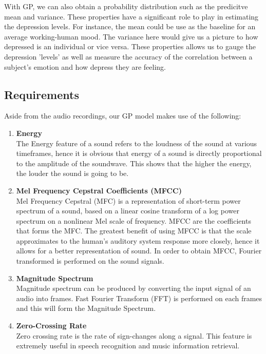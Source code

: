 \documentclass{article}
\begin{document}
	With GP, we can also obtain a probability distribution such as the predicitve mean and variance. 
	These properties have a significant role to play in estimating the depression levels. For instance, the mean could be use as the baseline for an average working-human mood. 
	The variance here would give us a picture to how depressed is an individual or vice versa.
	These properties allows us to gauge the depression 'levels' as well as measure the accuracy of the correlation between a subject's emotion and how depress they are feeling.

	\subsection{Requirements}
	Aside from the audio recordings, our GP model makes use of the following:
	\begin{enumerate}
		\item \textbf{Energy}	\\
		The Energy feature of a sound refers to the loudness of the sound at various timeframes, 
		hence it is obvious that energy of a sound is directly proportional to the amplitude of the soundwave. 
		This shows that the higher the energy, the louder the sound is going to be.	
	
		\item \textbf{Mel Frequency Cepstral Coefficients (MFCC)} \\
		Mel Frequency Cepstral (MFC) is a representation of short-term power spectrum of a sound, 
		based on a linear cosine transform of a log power spectrum on a nonlinear Mel scale of frequency. 
		MFCC are the coefficients that forms the MFC. The greatest benefit of using MFCC is that the scale approximates to the 
		human's auditory system response more closely, hence it allows for a better representation of sound. 
		In order to obtain MFCC, Fourier transformed is performed on the sound signals.	
	
		\item \textbf{Magnitude Spectrum} \\
		Magnitude spectrum can be produced by converting the input signal of an audio into frames. 
		Fast Fourier Transform (FFT) is performed on each frames and this will form the Magnitude Spectrum.
		
		\item \textbf{Zero-Crossing Rate} \\
		Zero crossing rate is the rate of sign-changes along a signal. This feature is extremely useful in speech recognition and music information retrieval.
	\end{enumerate}
\end{document}
